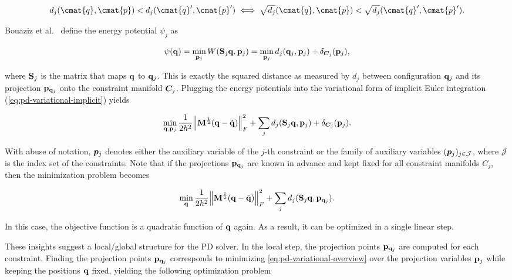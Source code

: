\[
    d_j(\cmat{q}, \cmat{p}) < d_j(\cmat{q}^\prime, \cmat{p}^\prime) \iff \sqrt{d_j}(\cmat{q}, \cmat{p}) < \sqrt{d_j}(\cmat{q}^\prime, 
    \cmat{p}^\prime).
\]

Bouaziz et al.\ \cite{bouaziz2014} define the energy potential $\psi_j$ as 

\begin{equation}\label{eq:pd-min-W}
    \psi(\mathbf{q}) = \min_{\mathbf{p}_j} W(\mathbf{S}_j\mathbf{q}, \mathbf{p}_j) 
    = \min_{\mathbf{p}_j} d_j(\mathbf{q}_j, \mathbf{p}_j) + \delta_{\bm{C}_j}(\mathbf{p}_j),
\end{equation}

\noindent where $\mathbf{S}_j$ is the matrix that maps $\mathbf{q}$ to $\mathbf{q}_j$. This is exactly the squared distance as measured by 
$d_j$ between configuration $\mathbf{q}_j$ and its projection $\mathbf{p}_{\mathbf{q}_j}$ onto the constraint manifold $\bm{C}_j$. 
Plugging the energy potentials into the variational form of implicit Euler integration (\cref{eq:pd-variational-implicit}) yields

\begin{equation}\label{eq:pd-variational-overview}
    \min_{\mathbf{q}, \mathbf{p}_j} \frac{1}{2h^2} \norm{\mathbf{M}^{\frac{1}{2}}(\mathbf{q} - \tilde{\mathbf{q}})}^2_F + 
    \sum_j d_j(\mathbf{S}_j \mathbf{q}, \mathbf{p}_j) + \delta_{\bm{C}_j}(\mathbf{p}_j).
\end{equation}

\noindent With abuse of notation, $\bm{p}_j$ denotes either the auxiliary variable of the $j$-th constraint or 
the family of auxiliary variables $(\bm{p}_j)_{j \in \mathcal{J}}$, where $\mathcal{J}$ is the index set of the 
constraints. Note that if the projections $\mathbf{p}_{\mathbf{q}_j}$ are known in advance and kept fixed for all constraint 
manifolds $C_j$, then the minimization problem becomes

\begin{equation}\label{eq:pd-global-d}
    \min_\mathbf{q} \frac{1}{2h^2} \norm{\mathbf{M}^{\frac{1}{2}}(\mathbf{q} - \tilde{\mathbf{q}})}^2_F + \sum_j d_j(\mathbf{S}_j
    \mathbf{q}, \mathbf{p}_{\mathbf{q}_j}).
\end{equation}

\noindent In this case, the objective function is a quadratic function of $\mathbf{q}$ again. As a result, it can be optimized in a single 
linear step. 

These insights suggest a local/global structure for the PD solver. In the local step, the projection points $\mathbf{p}_{\mathbf{q}_j}$
are computed for each constraint. Finding the projection points $\mathbf{p}_{\mathbf{q}_j}$ corresponds to minimizing 
\autoref{eq:pd-variational-overview} over the projection variables $\mathbf{p}_j$ while keeping the positions $\mathbf{q}$ fixed, yielding
the following optimization problem


